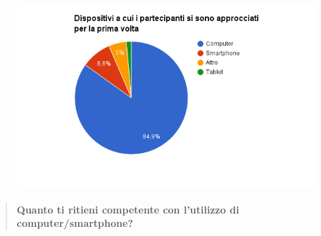 \begin{figure}[H]
	\centering
	\includegraphics[scale=0.6]{img/chart_tipo_primo_approccio_dispositivi}
\end{figure}

\begin{quote}
	\textbf{Quanto ti ritieni competente con l'utilizzo di
	computer/smartphone?}
\end{quote}

